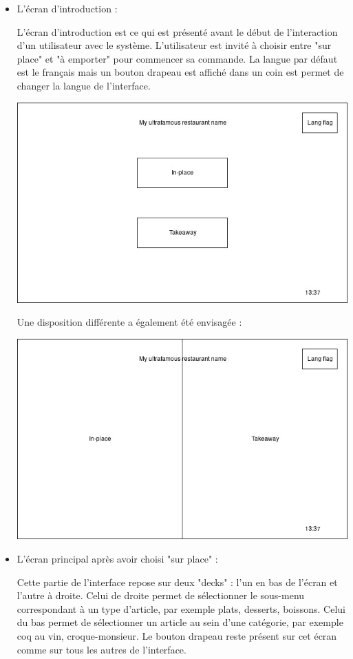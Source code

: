 \documentclass[a4paper,12pt]{article}
\begin{document}
\begin{itemize}

\item L'écran d'introduction :

L'écran d'introduction est ce qui est présenté avant le début de l'interaction d'un utilisateur avec le système. L'utilisateur est invité à choisir entre "sur place" et "à emporter" pour commencer sa commande. La langue par défaut est le français mais un bouton drapeau est affiché dans un coin est permet de changer la langue de l'interface.

\includegraphics[width=13cm]{intro_screen.jpg}

Une disposition différente a également été envisagée :

\includegraphics[width=13cm]{alt_intro_screen.jpg}

\item L'écran principal après avoir choisi "sur place" :

Cette partie de l'interface repose sur deux "decks" : l'un en bas de l'écran et l'autre à droite. Celui de droite permet de sélectionner le sous-menu correspondant à un type d'article, par exemple plats, desserts, boissons. Celui du bas permet de sélectionner un article au sein d'une catégorie, par exemple coq au vin, croque-monsieur. Le bouton drapeau reste présent sur cet écran comme sur tous les autres de l'interface.


\end{itemize}
\end{document}
